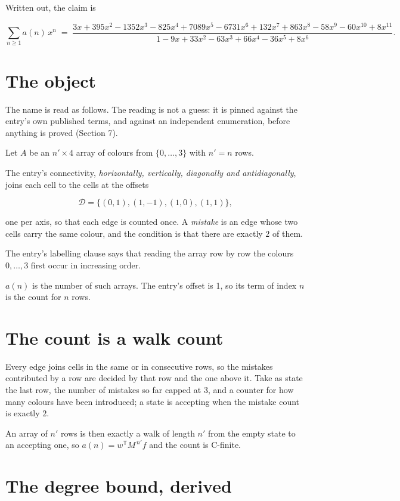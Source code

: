 \documentclass[11pt]{article}
\theoremstyle{definition}
\begin{document}
Written out, the claim is

\[\sum_{n \ge 1} a(n)\,x^n \;=\; \frac{3x + 395x^{2} - 1352x^{3} - 825x^{4} + 7089x^{5} - 6731x^{6} + 132x^{7} + 863x^{8} - 58x^{9} - 60x^{10} + 8x^{11}}{1 - 9x + 33x^{2} - 63x^{3} + 66x^{4} - 36x^{5} + 8x^{6}}.\]

\section{The object}

The name is read as follows. The reading is not a guess: it is pinned against the entry's own published terms, and against an independent enumeration, before anything is proved (Section 7).

Let $A$ be an $n' \times 4$ array of colours from $\{0,\dots,3\}$ with $n' = n$ rows.

The entry's connectivity, {\itshape horizontally, vertically, diagonally and antidiagonally}, joins each cell to the cells at the offsets

\[\mathcal{D} = \{(0,1), (1,-1), (1,0), (1,1)\},\]

one per axis, so that each edge is counted once. A {\itshape mistake} is an edge whose two cells carry the same colour, and the condition is that there are exactly $2$ of them.

The entry's labelling clause says that reading the array row by row the colours $0,\dots,3$ first occur in increasing order.

$a(n)$ is the number of such arrays. The entry's offset is 1, so its term of index $n$ is the count for $n$ rows.

\section{The count is a walk count}

Every edge joins cells in the same or in consecutive rows, so the mistakes contributed by a row are decided by that row and the one above it. Take as state the last row, the number of mistakes so far capped at $3$, and a counter for how many colours have been introduced; a state is accepting when the mistake count is exactly $2$.

An array of $n'$ rows is then exactly a walk of length $n'$ from the empty state to an accepting one, so $a(n) = w^{\mathsf T}M^{\,n'}f$ and the count is C-finite.

\section{The degree bound, derived}
\end{document}
